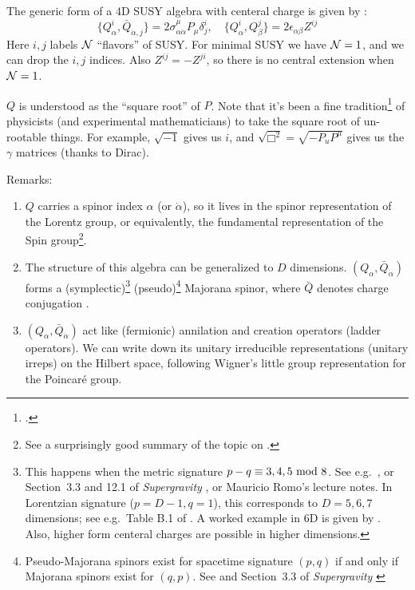 \documentclass[a4paper
	,10pt
]{article}
\begin{document}
	The generic form of a 4D SUSY algebra with centeral charge is given by \cite{Wess:1992cp}:
	\begin{equation}
		\{ Q^i_\alpha, \bar{Q}_{\dot{\alpha},j} \}
		= 2\sigma^\mu_{\alpha\dot{\alpha}} P_\mu
			\delta^i_j,
	\quad
		\{ Q^i_\alpha, Q^j_{\beta} \}
		= 2\epsilon_{\alpha\beta} Z^{ij}
	\end{equation}
	Here $i,j$ labels $\mathcal{N}$ ``flavors'' of SUSY. For minimal SUSY we have $\mathcal{N} = 1$, and we can drop the $i,j$ indices. Also $Z^{ij} = -Z^{ji}$, so there is no central extension when $\mathcal{N} = 1$. 
	
	$Q$ is understood as the ``square root'' of $P$. 
	Note that it's been a fine tradition\footnote{
		.
	} of physicists (and experimental mathematicians) to take the square root of un-rootable things. For example, $\sqrt{-1}$ gives us $i$, and $\sqrt{\Box^2} = \sqrt{-P_u P^\mu}$ gives us the $\gamma$ matrices (thanks to Dirac). 
	
	Remarks:
	\begin{enumerate}
	\item $Q$ carries a spinor index $\alpha$ (or $\dot{\alpha}$), so it lives in the spinor representation of the Lorentz group, or equivalently, the fundamental representation of the Spin group\footnote{
		See a surprisingly good summary of the topic on . 
	}. 
	
	\item The structure of this algebra can be generalized to $D$ dimensions. $(Q_\alpha, \bar{Q}_{\dot{\alpha}})$ forms a \mbox{(symplectic)}\footnote{
		This happens when the metric signature $p - q \equiv 3,4,5\,\operatorname{mod}\,8$. See e.g.~\textcite{figueroa2015majorana}, or Section~3.3 and 12.1 of \textit{Supergravity} \cite{Freedman:2012zz}, or Mauricio Romo's lecture notes. In Lorentzian signature ($p = D-1, q = 1$), this corresponds to $D = 5,6,7$ dimensions; see e.g.~Table B.1 of \textcite{Polchinski:1998rq}. A worked example in 6D is given by \cite{Gustavsson:2001uw}. Also, higher form centeral charges are possible in higher dimensions. 
	} (pseudo)\footnote{
		Pseudo-Majorana spinors exist for spacetime signature $(p,q)$ if and only if Majorana spinors exist for $(q,p)$. See \textcite{figueroa2015majorana} and Section~3.3 of \textit{Supergravity} \cite{Freedman:2012zz}
	} Majorana spinor, where $\bar{Q}$ denotes charge conjugation \cite{Freedman:2012zz}. 
	
	\item $(Q_\alpha, \bar{Q}_{\dot{\alpha}})$ act like (fermionic) annilation and creation operators (ladder operators). We can write down its unitary irreducible representations (unitary irreps) on the Hilbert space, following Wigner's little group representation for the Poincar\'e group. 
	\end{enumerate}
\end{document}
